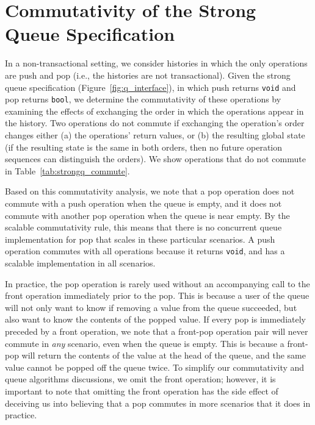 \section{Commutativity of the Strong Queue Specification} 

In a non-transactional setting, we consider histories in which the only operations are push and pop (i.e., the histories are not transactional). Given the strong queue specification (Figure~\ref{fig:q_interface}), in which push returns \texttt{void} and pop returns \texttt{bool}, we determine the commutativity of these operations by examining the effects of exchanging the order in which the operations appear in the history. Two operations do not commute if exchanging the operation's order changes either (a) the operations' return values, or (b) the resulting global state (if the resulting state is the same in both orders, then no future operation sequences can distinguish the orders). We show operations that do not commute in Table~\ref{tab:strongq_commute}.

Based on this commutativity analysis, we note that a pop operation does not commute with a push operation when the queue is empty, and it does not commute with another pop operation when the queue is near empty. By the scalable commutativity rule, this means that there is no concurrent queue implementation for pop that scales in these particular scenarios. A push operation commutes with all operations because it returns \texttt{void}, and has a scalable implementation in all scenarios.

In practice, the pop operation is rarely used without an accompanying call to the front operation immediately prior to the pop. This is because a user of the queue will not only want to know if removing a value from the queue succeeded, but also want to know the contents of the popped value. If every pop is immediately preceded by a front operation, we note that a front-pop operation pair will never commute in \emph{any} scenario, even when the queue is empty. This is because a front-pop will return the contents of the value at the head of the queue, and the same value cannot be popped off the queue twice. To simplify our commutativity and queue algorithms discussions, we omit the front operation; however, it is important to note that omitting the front operation has the side effect of deceiving us into believing that a pop commutes in more scenarios that it does in practice.

